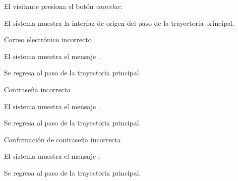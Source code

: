 {\begin{trayectoriaAlternativa}
    \item El visitante presiona el botón \textit{cancelar}.

    \item El sistema muestra la interfaz de origen del paso
       de la trayectoria principal.

  \end{trayectoriaAlternativa}


  \begin{trayectoriaAlternativa}
    {Correo electrónico incorrecto}

    \item El sistema muestra el mensaje
      .

    \item Se regresa al paso  de la trayectoria
      principal.

  \end{trayectoriaAlternativa}


  \begin{trayectoriaAlternativa}
    {Contraseña incorrecta}

    \item El sistema muestra el mensaje
      .

    \item Se regresa al paso  de la trayectoria
      principal.

  \end{trayectoriaAlternativa}


  \begin{trayectoriaAlternativa}
    {Confirmación de contraseña incorrecta}

    \item El sistema muestra el mensaje
      .

    \item Se regresa al paso  de la trayectoria
      principal.


\end{trayectoriaAlternativa}}
